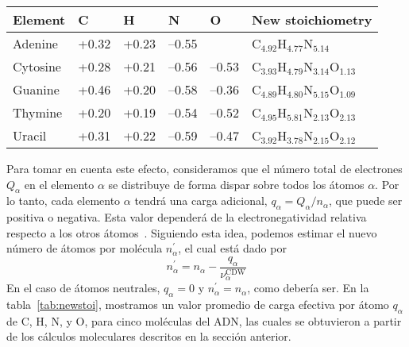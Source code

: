 \begin{table*}[t]
\begin{center}
\begin{tabular}{|p{}|p{}|p{}|p{
}|p{}|p{}|}
\hline
Element & C & H & N & O & New stoichiometry \\
\hline
Adenine & +0.32 & +0.23 & --0.55 &       & 
C$_{4.92}$H$_{4.77}$N$_{5.14}$ \\ 
\hline
Cytosine & +0.28 & +0.21 & --0.56 & --0.53 & 
C$_{3.93}$H$_{4.79}$N$_{3.14}$O$_{1.13}$ \\ 
\hline
Guanine & +0.46 & +0.20 & --0.58 & --0.36 & 
C$_{4.89}$H$_{4.80}$N$_{5.15}$O$_{1.09}$ \\ 
\hline
Thymine & +0.20 & +0.19 & --0.54 & --0.52 & 
C$_{4.95}$H$_{5.81}$N$_{2.13}$O$_{2.13}$ \\ 
\hline
Uracil & +0.31 & +0.22 & --0.59 & --0.47 & 
C$_{3.92}$H$_{3.78}$N$_{2.15}$O$_{2.12}$ \\ 
\hline
\end{tabular}
\caption[Cargas efectivas medias de Mulliken por átomo]
{Cargas efectivas medias de Mulliken por átomo $q_{\alpha}$, y nueva formula
estequiométrica definida por la ecuación~(\ref{eq:newstoi}) para cinco
moléculas de ADN.}
\label{tab:newstoi}
\end{center}
\end{table*}

Para tomar en cuenta este efecto, consideramos que el número total de 
electrones $Q_{\alpha }$ en el elemento $\alpha$ se distribuye de forma
dispar sobre todos los átomos $\alpha$. Por lo tanto, cada elemento  
$\alpha$ tendrá una carga adicional, $q_{\alpha}=Q_{\alpha}/n_{\alpha}$, 
que puede ser positiva o negativa. Esta valor dependerá de la 
electronegatividad relativa respecto a los otros átomos~\cite{rappe1991}. 
Siguiendo esta idea, podemos estimar el nuevo número de átomos por 
molécula $n_{\alpha }^{\prime }$, el cual está dado por
\begin{equation}
n_{\alpha }^{\prime }=n_{\alpha }-
\frac{q_{\alpha }}{\nu_{\alpha }^{\text{CDW}}}
\label{eq:newstoi}
\end{equation}
En el caso de átomos neutrales, $q_{\alpha}=0$ y 
$n_{\alpha}^{\prime}=n_{\alpha}$, como debería ser. En la 
tabla~\ref{tab:newstoi}, mostramos un valor promedio de carga efectiva por
átomo $q_{\alpha}$ de C, H, N, y O, para cinco moléculas del ADN,
las cuales se obtuvieron a partir de los cálculos moleculares descritos 
en la sección anterior.

